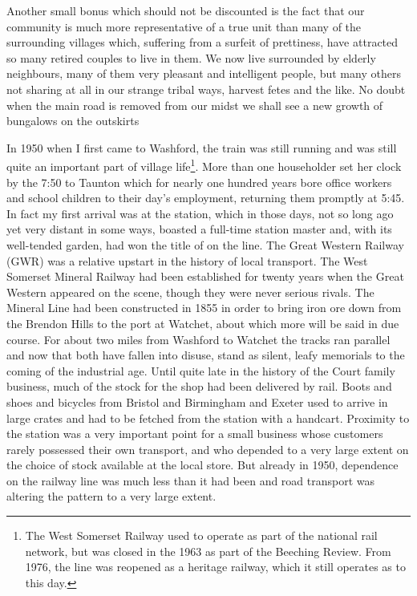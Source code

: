 Another small bonus which should not be discounted is the fact that our community is much more representative of a true unit than many of the surrounding villages which, suffering from a surfeit of prettiness, have attracted so many retired couples to live in them. We now live surrounded by elderly neighbours, many of them very pleasant and intelligent people, but many others not sharing at all in our strange tribal ways, harvest fetes and the like. No doubt when the main road is removed from our midst we shall see a new growth of bungalows on the outskirts

In 1950 when I first came to Washford, the train was still running and was still quite an important part of village life\footnote{The West Somerset Railway used to operate as part of the national rail network, but was closed in the 1963 as part of the Beeching Review. From 1976, the line was reopened as a heritage railway, which it still operates as to this day.}. More than one householder set her clock by the 7:50 to Taunton which for nearly one hundred years bore office workers and school children to their day's employment, returning them promptly at 5:45. In fact my first arrival was at the station, which in those days, not so long ago yet very distant in some ways, boasted a full-time station master and, with its well-tended garden, had won the title of  on the line. The Great Western Railway (GWR) was a relative upstart in the history of local transport. The West Somerset Mineral Railway had been established for twenty years when the Great Western appeared on the scene, though they were never serious rivals. The Mineral Line had been constructed in 1855 in order to bring iron ore down from the Brendon Hills to the port at Watchet, about which more will be said in due course. For about two miles from Washford to Watchet the tracks ran parallel and now that both have fallen into disuse, stand as silent, leafy memorials to the coming of the industrial age. Until quite late in the history of the Court family business, much of the stock for the shop had been delivered by rail. Boots and shoes and bicycles from Bristol and Birmingham and Exeter used to arrive in large crates and had to be fetched from the station with a handcart. Proximity to the station was a very important point for a small business whose customers rarely possessed their own transport, and who depended to a very large extent on the choice of stock available at the local store. But already in 1950, dependence on the railway line was much less than it had been and road transport was altering the pattern to a very large extent.

